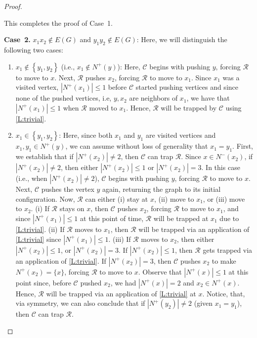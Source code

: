 \documentclass[a4paper,12pt]{amsart}
\newcommand{\set}[1]{\left\{#1\right\}}
\newcommand{\R}{\mathcal{R}}
\newcommand{\C}{\mathcal{C}}
\newenvironment{proofofclaim}{%
  \renewcommand{\proofname}{Proof of Claim}\proof}{\endproof}
\let\leq\leqslant
\begin{document}
\begin{proof}
\begin{proofofclaim}
\begin{enumerate}
\begin{enumerate}
              \end{enumerate}
            
            
        \end{enumerate}
    This completes the proof of Case~1.

    \medskip
    \noindent \textbf{Case~2.} $x_1x_2\notin E(G)$ and $y_1y_2 \notin E(G)$: Here, we will distinguish the following two cases:
    \begin{enumerate}
        \item $x_1 \notin \set{y_1,y_2}$ (i.e., $x_1 \notin N^+(y)$): Here, $\C$ begins with pushing $y$, forcing $\R$ to move to $x$. Next, $\R$ pushes $x_2$, forcing $\R$ to move to $x_1$. Since $x_1$ was a visited vertex, $|N^+(x_1)| \leq 1$ before $\C$ started pushing vertices and since none of the pushed vertices, i.e, $y,x_2$ are neighbors of $x_1$, we have that $|N^+(x_1)|\leq 1$ when $\R$ moved to $x_1$. Hence, $\R$ will be trapped by $\C$ using \cref{L:trivial}.

        \item $x_1\in \set{y_1,y_2}$: Here, since both $x_1$ and $y_1$ are visited vertices and $x_1, y_1\in N^+(y)$, we can assume without loss of generality that $x_1=y_1$. First, we establish that if $|N^+(x_2)| \neq 2$, then $\C$ can trap $\R$. Since $x\in N^-(x_2)$, if $|N^+(x_2)| \neq 2$, then either $|N^+(x_2)| \leq 1$ or $|N^+(x_2)| = 3$. In this case (i.e., when $|N^+(x_2)| \neq 2$), $\C$ begins with pushing $y$, forcing $\R$ to move to $x$. Next, $\C$ pushes the vertex $y$ again, returning the graph to its initial configuration. Now, $\R$ can either (i) stay at $x$, (ii) move to $x_1$, or (iii) move to $x_2$. (i) If $\R$ stays on $x$, then $\C$ pushes $x_2$, forcing $\R$ to move to $x_1$, and since $|N^+(x_1)| \leq 1$ at this point of time, $\R$ will be trapped at $x_1$ due to \cref{L:trivial}. (ii) If $\R$ moves to $x_1$, then $\R$ will be trapped via an application of \cref{L:trivial} since $|N^+(x_1)|\leq 1$. (iii) If $\R$ moves to $x_2$, then either $|N^+(x_2)| \leq 1$, or $|N^+(x_2)| = 3$. If $|N^+(x_2)|\leq 1$, then $\R$ gets trapped via an application of \cref{L:trivial}. If $|N^+(x_2)| = 3$, then $\C$ pushes $x_2$ to make $N^+(x_2) = \{x\}$, forcing $\R$ to move to $x$. Observe that $|N^+(x)|\leq 1$  at this point since, before $\C$ pushed $x_2$, we had $|N^+(x)| =2$ and $x_2\in N^+(x)$. Hence, $\R$ will be trapped via an application of \cref{L:trivial} at $x$. Notice, that, via symmetry, we can also conclude that if $|N^+(y_2)| \neq 2$ (given $x_1=y_1$), then $\C$ can trap $\R$. 


\end{enumerate}
\end{proofofclaim}
\end{proof}
\end{document}
